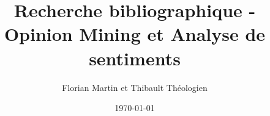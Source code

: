 \documentclass{article}
\title{Recherche bibliographique - Opinion Mining et Analyse de sentiments}
\author{Florian Martin et Thibault Théologien}
\date{\today}
\begin{document}


\nocite{*}
\end{document}
